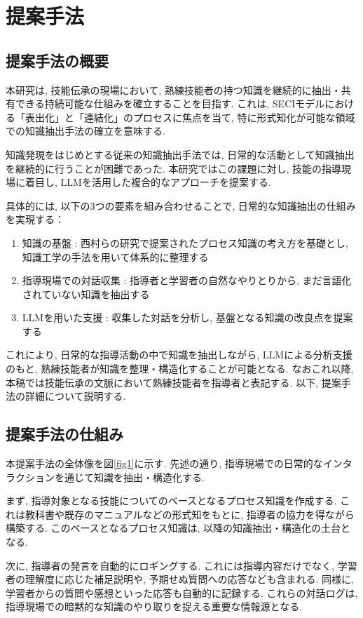 \chapter{提案手法}
\section{提案手法の概要}
本研究は, 技能伝承の現場において, 熟練技能者の持つ知識を継続的に抽出・共有できる持続可能な仕組みを確立することを目指す. これは, SECIモデルにおける「表出化」と「連結化」のプロセスに焦点を当て, 特に形式知化が可能な領域での知識抽出手法の確立を意味する.

知識発現\cite{Nishimura2017}をはじめとする従来の知識抽出手法では, 日常的な活動として知識抽出を継続的に行うことが困難であった. 本研究ではこの課題に対し, 技能の指導現場に着目し, LLMを活用した複合的なアプローチを提案する. 

具体的には, 以下の3つの要素を組み合わせることで, 日常的な知識抽出の仕組みを実現する：
\begin{enumerate}
    \item 知識の基盤 : 西村らの研究で提案されたプロセス知識の考え方を基礎とし, 知識工学の手法を用いて体系的に整理する
    \item 指導現場での対話収集 : 指導者と学習者の自然なやりとりから, まだ言語化されていない知識を抽出する
    \item LLMを用いた支援 : 収集した対話を分析し, 基盤となる知識の改良点を提案する
\end{enumerate}

これにより, 日常的な指導活動の中で知識を抽出しながら, LLMによる分析支援のもと, 熟練技能者が知識を整理・構造化することが可能となる. なおこれ以降, 本稿では技能伝承の文脈において熟練技能者を指導者と表記する. 以下, 提案手法の詳細について説明する.

\section{提案手法の仕組み}
本提案手法の全体像を図\ref{fig1}に示す. 先述の通り, 指導現場での日常的なインタラクションを通じて知識を抽出・構造化する.

まず, 指導対象となる技能についてのベースとなるプロセス知識を作成する. これは教科書や既存のマニュアルなどの形式知をもとに, 指導者の協力を得ながら構築する. このベースとなるプロセス知識は, 以降の知識抽出・構造化の土台となる. 

次に, 指導者の発言を自動的にロギングする. これには指導内容だけでなく, 学習者の理解度に応じた補足説明や, 予期せぬ質問への応答なども含まれる. 同様に, 学習者からの質問や感想といった応答も自動的に記録する. これらの対話ログは, 指導現場での暗黙的な知識のやり取りを捉える重要な情報源となる. 

